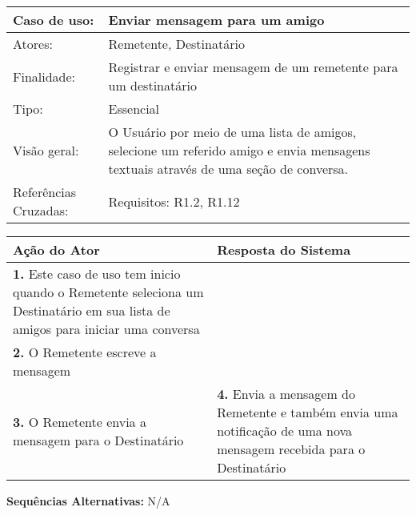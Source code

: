 \documentclass[12pt,a4paper,onecolumn,titlepage]{article}
\begin{document}
\begin{table}[h!]
\begin{center}
\begin{tabular}{p{2.5cm} p{9.5cm}}
Caso de uso: & \textbf{Enviar mensagem para um amigo} \\ \hline
Atores: & Remetente, Destinatário \\ \hline
Finalidade: & Registrar e enviar mensagem de um remetente para um destinatário\\ \hline
Tipo: & Essencial \\ \hline
Visão geral: & O Usuário por meio de uma lista de amigos, selecione um referido amigo e envia mensagens textuais através de uma seção de conversa. \\ \hline
Referências Cruzadas: & Requisitos: R1.2, R1.12\\

\end{tabular}
\end{center}
\end{table} 

\begin{center}
\def\arraystretch{1.1}
\begin{tabular}{|p{6cm}|p{6cm}|}

\hline
\textbf{Ação do Ator} & \textbf{Resposta do Sistema} \\ \hline
\textbf{1.} Este caso de uso tem inicio quando o Remetente seleciona um Destinatário em sua lista de amigos para iniciar uma conversa  &  \\ \hline
\textbf{2.} O Remetente escreve a mensagem  &   \\ \hline
\textbf{3.} O Remetente envia a mensagem para o Destinatário  &
\textbf{4.} Envia a mensagem do Remetente e também envia uma notificação de uma nova mensagem recebida para o Destinatário \\ \hline
\end{tabular}
\end{center}

\textbf{Sequências Alternativas:} N/A

\newpage
\end{document}
